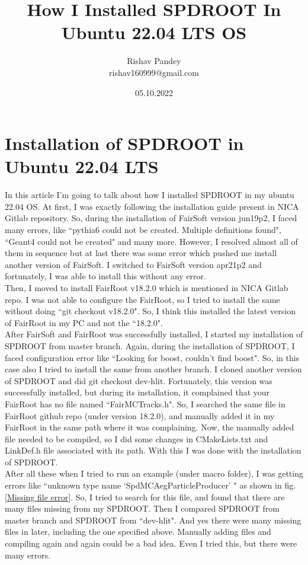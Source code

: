 \documentclass[12pt]{article}
\title{\large \textbf{How I Installed SPDROOT In Ubuntu 22.04 LTS OS}}
\author{Rishav Pandey\\ rishav160999@gmail.com}
\date{05.10.2022}
\begin{document}
\maketitle

\section{Installation of SPDROOT in Ubuntu 22.04 LTS}
In this article I'm going to talk about how I installed SPDROOT in my ubuntu 22.04 OS. At first, I was exactly following the installation guide present in NICA Gitlab repository. So, during the installation of FairSoft version jun19p2, I faced many errors, like ``pythia6 could not be created. Multiple definitions found", ``Geant4 could not be created" and many more. However, I resolved almost all of them in sequence but at last there was some error which pushed me install another version of FairSoft. I switched to FairSoft version apr21p2 and fortunately, I was able to install this without any error.\\

Then, I moved to install FairRoot v18.2.0 which is mentioned in NICA Gitlab repo. I was not able to configure the FairRoot, so I tried to install the same without doing ``git checkout v18.2.0". So, I think this installed the latest version of FairRoot in my PC and not the ``18.2.0".\\

After FairSoft and FairRoot was successfully installed, I started my installation of SPDROOT from master branch. Again, during the installation of SPDROOT, I faced configuration error like ``Looking for boost, couldn't find boost". So, in this case also I tried to install the same from another branch. I cloned another version of SPDROOT and did git checkout dev-hlit. Fortunately, this version was successfully installed, but during its installation, it complained that your FairRoot has no file named ``FairMCTracks.h".
So, I searched the same file in FairRoot github repo (under version 18.2.0), and manually added it in my FairRoot in the same path where it was complaining. Now, the manually added file needed to be compiled, so I did some changes in CMakeLists.txt and LinkDef.h file associated with its path. With this I was done with the installation of SPDROOT.\\

After all these when I tried to run an example (under macro folder), I was getting errors like ``unknown type name `SpdMCAegParticleProducer' " as shown in fig. \ref{Missing file error}. So, I tried to search for this file, and found that there are many files missing from my SPDROOT. Then I compared SPDROOT from master branch and SPDROOT from ``dev-hlit". And yes there were many missing files in later, including the one specified above. Manually adding files and compiling again and again could be a bad idea. Even I tried this, but there were many errors.\\
\end{document}
